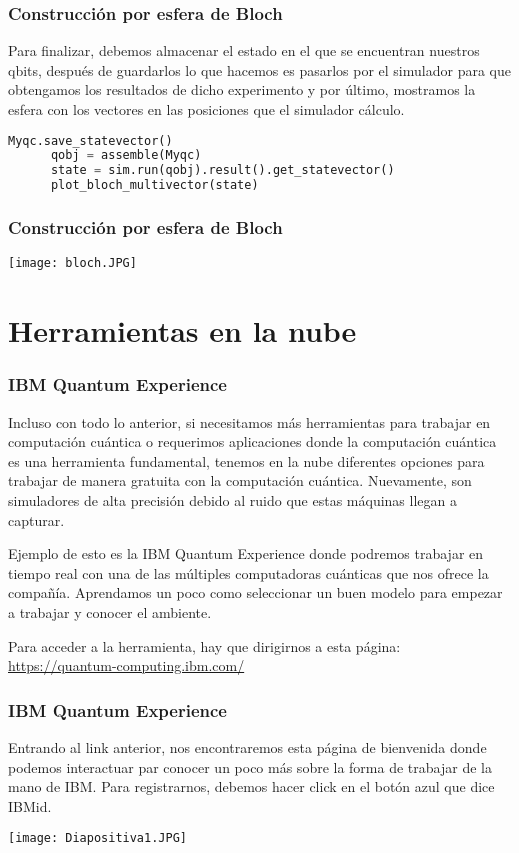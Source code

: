 \documentclass[spanish]{beamer}
\begin{document}
    \newpage\begin{frame}[fragile]
    \frametitle{Construcción por esfera de Bloch} 
   Para finalizar, debemos almacenar el estado en el que se encuentran nuestros qbits, después de guardarlos lo que hacemos es pasarlos por el simulador para que obtengamos los resultados de dicho experimento y por último, mostramos la esfera con los vectores en las posiciones que el simulador cálculo.
    
    \begin{lstlisting}[language=Python]
      Myqc.save_statevector()
      qobj = assemble(Myqc)
      state = sim.run(qobj).result().get_statevector()
      plot_bloch_multivector(state)\end{lstlisting}
 
    \end{frame}
    \newpage\begin{frame}
    \frametitle{Construcción por esfera de Bloch} 
    \centering\texttt{[image: bloch.JPG]}
    \end{frame}
\section{Herramientas en la nube}        
 \setlength{\parskip}{1mm}
 \begin{frame}[fragile]
 \frametitle{IBM Quantum Experience} 
 \justify    
 Incluso con todo lo anterior, si necesitamos más herramientas para trabajar en computación cuántica o requerimos aplicaciones donde la computación cuántica es una herramienta fundamental, tenemos en la nube diferentes opciones para trabajar de manera gratuita con la computación cuántica. Nuevamente, son simuladores de alta precisión debido al ruido que estas máquinas llegan a capturar.
 
 Ejemplo de esto es la IBM Quantum Experience donde podremos trabajar en tiempo real con una de las múltiples computadoras cuánticas que nos ofrece la compañía. Aprendamos un poco como seleccionar un buen modelo para empezar a trabajar y conocer el ambiente.
 
 Para acceder a la herramienta, hay que dirigirnos a esta página:  \url{https://quantum-computing.ibm.com/}

 \end{frame}
 
 \newpage\begin{frame}
 \frametitle{IBM Quantum Experience} 
 \justify 
Entrando al link anterior, nos encontraremos esta página de bienvenida donde podemos interactuar par conocer un poco más sobre la forma de trabajar de la mano de IBM. Para registrarnos, debemos hacer click en el botón azul que dice IBMid.
 
 \centering\texttt{[image: Diapositiva1.JPG]}
 \end{frame}
 
\end{document}
